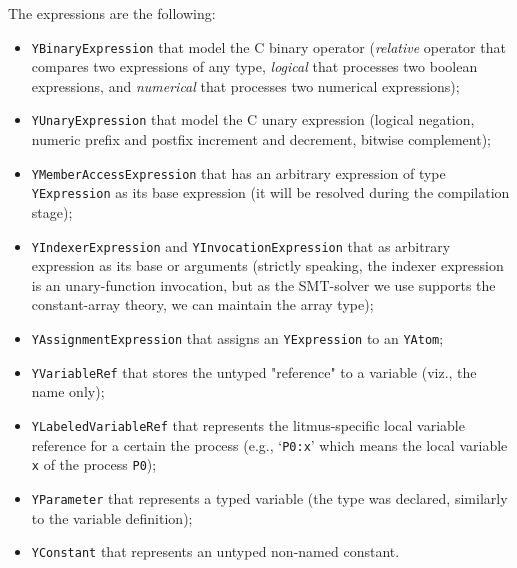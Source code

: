 
\vspace{1em}
The \ytree{} expressions are the following:

\begin{itemize}%
  \item \texttt{YBinaryExpression} that model the C binary operator (\textit{relative} operator that compares two expressions of any type, \textit{logical} that processes two boolean expressions, and \textit{numerical} that processes two numerical expressions);

  \item \texttt{YUnaryExpression} that model the C unary expression (logical negation, numeric prefix and postfix increment and decrement, bitwise complement);

  \item \texttt{YMemberAccessExpression} that has an arbitrary expression of type \texttt{YExpression} as its base expression (it will be resolved during the compilation stage);%

  \item \texttt{YIndexerExpression} and \texttt{YInvocationExpression} that as arbitrary expression as its base or arguments (strictly speaking, the indexer expression is an unary-function invocation, but as the SMT-solver we use supports the constant-array theory, we can maintain the array type);

  \item \texttt{YAssignmentExpression} that assigns an \texttt{YExpression} to an \texttt{YAtom};

  \item \texttt{YVariableRef} that stores the untyped "reference" to a variable (viz., the name only);

  \item \texttt{YLabeledVariableRef} that represents the litmus-specific local variable reference for a certain the process (e.g., `\lstinline{P0:x}' which means the local variable \lstinline{x} of the process \lstinline{P0});

  \item \texttt{YParameter} that represents a typed variable (the type was declared, similarly to the variable definition);

  \item \texttt{YConstant} that represents an untyped non-named constant.
\end{itemize}


